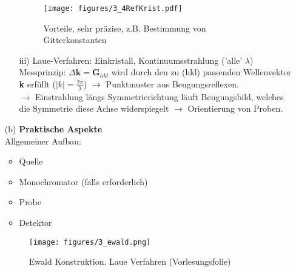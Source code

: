 \begin{itemize}
\begin{itemize}
		\begin{figure}[H]
			\centering
			\texttt{[image: figures/3\_4RefKrist.pdf]}
			\caption{Vorteile, sehr präzise, z.B. Bestimmung von Gitterkonstanten}
			\label{}
		\end{figure}
		\item[iii)] Laue-Verfahren:
		Einkristall, Kontinuumsstrahlung ('alle' $\lambda$) Messprinzip: $\Delta \textbf{k} = \textbf{G}_{hkl}$ wird durch den zu (hkl) passenden Wellenvektor \textbf{k} erfüllt ($|k| = \frac{2\pi}{\lambda}$) $\rightarrow$ Punktmuster aus Beugungsreflexen. \\
		$\rightarrow$ Einstrahlung längs Symmetrierichtung läuft Beugungsbild, welches die Symmetrie diese Achse widerspiegelt $\rightarrow$ Orientierung von Proben.
	\end{itemize}
	\item[(b)] \textbf{Praktische Aspekte}\\
	Allgemeiner Aufbau:
	\begin{itemize}
		\item Quelle
		\item Monochromator (falls erforderlich)
		\item Probe
		\item Detektor
	\end{itemize}
	\begin{figure}[H]
		\centering
		\texttt{[image: figures/3\_ewald.png]}
		\caption{Ewald Konstruktion. Laue Verfahren (Vorlesungsfolie)}
		\label{}
	\end{figure}
\end{itemize}
